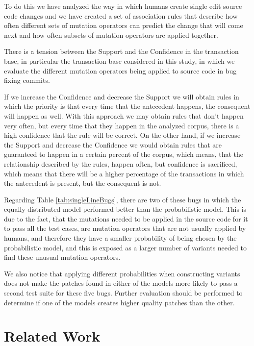 \documentclass[conference]{IEEEtran}
\begin{document}
To do this we have analyzed the way in which humans create single edit 
source code changes and we have created a set of association rules that describe 
how often different sets of mutation operators can predict the change that will 
come next and how often subsets of mutation operators are applied together.

There is a tension between the Support and the Confidence in the transaction 
base, in particular the transaction base considered in this study, in which we 
evaluate the different mutation operators being applied to source code in bug 
fixing commits. 

If we increase the Confidence and decrease the Support we will obtain rules in 
which the priority is that every time that the antecedent happens, the 
consequent will happen as well. With this approach we may obtain rules that 
don't happen very often, but every time that they happen in the analyzed corpus, 
there is a high confidence that the rule will be correct. On the other hand, if 
we increase the Support and decrease the Confidence we would obtain rules that 
are guaranteed to happen in a certain percent of the corpus, which means, that 
the relationship described by the rules, happen often, but confidence is 
sacrificed, which means that there will be a higher percentage of the 
transactions in which the antecedent is present, but the consequent is not. 

Regarding Table \ref{tab:singleLineBugs}, there are two of these bugs in which
the equally distributed model performed better than the probabilistic
model. This is due to the fact, that the mutations needed to be applied in the
source code for it to pass all the test cases, are mutation operators that are
not usually applied by humans, and therefore they have a smaller probability of
being chosen by the probabilistic model, and this is exposed as a larger number
of variants needed to find these unusual mutation operators. 

We also notice that applying different probabilities when constructing variants
does not make the patches found in either of the models more likely to pass a
second test suite for these five bugs. Further evaluation should be performed to
determine if one of the models creates higher quality patches than the other. 



\section{Related Work} \label{relatedWork}
\end{document}
